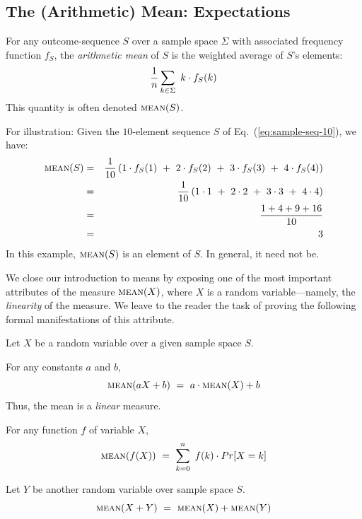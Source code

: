 \subsection{The (Arithmetic) Mean: Expectations}
\label{sec:mean}

   
For any outcome-sequence $S$ over a sample space $\Sigma$ with associated frequency function $f_S$, the {\it arithmetic mean} of $S$ is the weighted average of $S$'s elements:
\[ {1 \over n} \sum_{k \in \Sigma} \ k \cdot f_S(k) \]
This quantity is often denoted $\mbox{\sc mean}(S)$.  

\smallskip

For illustration: Given the $10$-element sequence $S$ of Eq.~(\ref{eq:sample-seq-10}), we have:
\begin{eqnarray*}
\mbox{\sc mean}(S) & = &
{1 \over 10} \left(1 \cdot f_S(1) \ + \ 2 \cdot f_S(2) \ + \ 3 \cdot f_S(3) \ + \ 4 \cdot f_S(4) \right) \\
 & = &
{1 \over 10} \left(1 \cdot 1 \ + \ 2 \cdot 2 \ + \ 3 \cdot 3 \ + \ 4 \cdot 4 \right) \\
 & = &
\frac{1 + 4 + 9 + 16}{10} \\
 & = & 3
\end{eqnarray*}
In this example, $\mbox{\sc mean}(S)$ is an element of $S$.  In general, it need not be.

\smallskip

We close our introduction to means by exposing one of the most important attributes of the measure $\mbox{\sc mean}(X)$, where $X$ is a random variable---namely, the {\em linearity} of the measure.  We leave to the reader the task of proving the following formal manifestations of this attribute.

\begin{prop} 
\label{thm:mean-linear}
Let $X$ be a random variable over a given sample space $S$.

\smallskip

For any constants $a$ and $b$,
\[ \mbox{\sc mean}(aX+b) \ = \ a \cdot \mbox{\sc mean}(X) + b  \]
Thus, the mean is a {\em linear} measure.

\medskip

For any function $f$ of variable $X$,
\[ \mbox{\sc mean}(f(X)) \ = \ \sum_{k=0}^n \ f(k) \cdot Pr[X = k] \]

\smallskip

Let $Y$ be another random variable over sample space $S$.
\[ \mbox{\sc mean}(X+Y) \ = \  \mbox{\sc mean}(X) + \mbox{\sc mean}(Y) \]
\end{prop}

